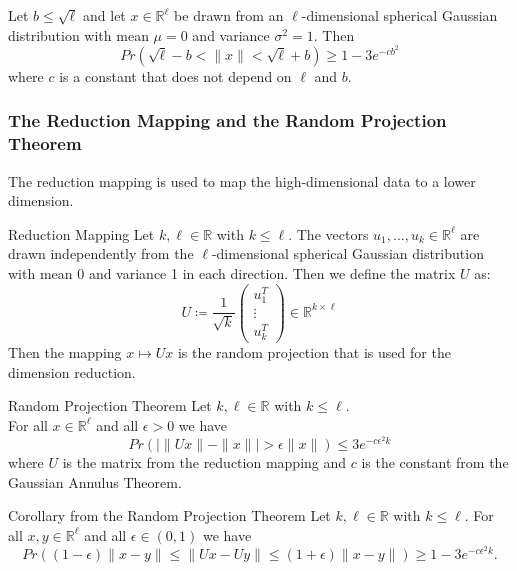 \documentclass[english]{panikzettel}
\begin{document}
\begin{theo}{} %
Let $b\leq \sqrt{\ell}$ and let $x\in\mathbb{R}^\ell$ be drawn from an $\ell$-dimensional spherical Gaussian distribution with mean $\mu=0$ and variance $\sigma^2=1$. Then
\[
Pr(\sqrt{\ell}-b < \parallel x\parallel < \sqrt{\ell}+b)\geq 1-3e^{-cb^2}
\]
where $c$ is a constant that does not depend on $\ell$ and $b$.
\end{theo}

\subsubsection{The Reduction Mapping and the Random Projection Theorem}
The reduction mapping is used to map the high-dimensional data to a lower dimension.

\begin{halfboxl}
\vspace{-\baselineskip}
\begin{defi}{Reduction Mapping}
Let $k,\ell\in\mathbb{R}$ with $k\leq\ell$. The vectors $u_1,...,u_k\in\mathbb{R}^\ell$ are drawn independently from the $\ell$-dimensional spherical Gaussian distribution with mean 0 and variance 1 in each direction. Then we define the matrix $U$ as:
\[
U\coloneqq \frac{1}{\sqrt{k}}
\begin{pmatrix}
u_1^T\\
\vdots\\
u_k^T
\end{pmatrix}
\in\mathbb{R}^{k\times\ell}
\]
Then the mapping $x\mapsto Ux$ is the random projection that is used for the dimension reduction.
\end{defi}

\end{halfboxl}
\begin{halfboxr}
\vspace{-\baselineskip}
\begin{theo}{Random Projection Theorem}
Let $k,\ell\in\mathbb{R}$ with $k\leq\ell$. \\
For all $x\in\mathbb{R}^\ell$ and all $\epsilon>0$ we have
\[
Pr\left(\mid \parallel Ux \parallel - \parallel x\parallel \mid > \epsilon \parallel x \parallel\right) \leq 3e^{-c\epsilon^2k}
\]
where $U$ is the matrix from the reduction mapping and $c$ is the constant from the Gaussian Annulus Theorem.
\end{theo}
\end{halfboxr}

\begin{theo}{Corollary from the Random Projection Theorem}
Let $k,\ell\in\mathbb{R}$ with $k\leq\ell$. For all $x,y\in\mathbb{R}^\ell$ and all $\epsilon\in (0,1)$ we have
\[
Pr\left( (1-\epsilon) \parallel x-y \parallel \leq \parallel Ux - Uy \parallel \leq (1+\epsilon) \parallel x-y \parallel \right) \geq 1 - 3e^{-c\epsilon^2k}.
\]
\end{theo}
\end{document}
